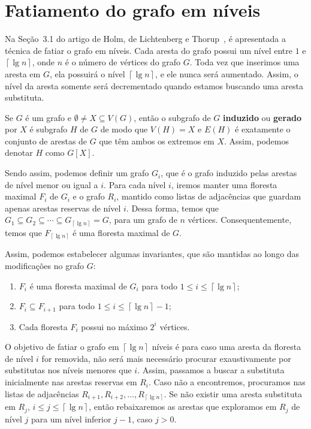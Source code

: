 \section{Fatiamento do grafo em níveis}
\label{sec:level-slicing}

Na Seção~3.1 do artigo de Holm, de Lichtenberg e Thorup~\cite{jacob_holm}, é apresentada a técnica de fatiar o grafo em níveis. Cada aresta do grafo possui um nível entre $1$ e $\left\lceil \lg n \right\rceil$, onde $n$ é o número de vértices do grafo $G$. Toda vez que inserimos uma aresta em $G$, ela possuirá o nível $\left\lceil \lg n \right\rceil$, e ele nunca será aumentado. Assim, o nível da aresta somente será decrementado quando estamos buscando uma aresta substituta. 

Se $G$ é um grafo e $\emptyset \neq X \subseteq V(G)$, então o subgrafo de $G$ \textbf{induzido} ou \textbf{gerado} por $X$ é subgrafo $H$ de $G$ de modo que $V(H) = X$ e $E(H)$ é exatamente o conjunto de arestas de $G$ que têm ambos os extremos em $X$. Assim, podemos denotar $H$ como $G[X]$.

Sendo assim, podemos definir um grafo $G_i$, que é o grafo induzido pelas arestas de nível menor ou igual a $i$. Para cada nível $i$, iremos manter uma floresta maximal $F_i$ de $G_i$ e o grafo $R_i$, mantido como listas de adjacências que guardam apenas arestas reservas de nível $i$. Dessa forma, temos que $G_1 \subseteq G_2 \subseteq \cdots \subseteq G_{\left\lceil \lg n \right\rceil} = G$, para um grafo de $n$ vértices. Consequentemente, temos que $F_{\left\lceil \lg n \right\rceil}$ é uma floresta maximal de $G$. 

Assim, podemos estabelecer algumas invariantes, que são mantidas ao longo das modificações no grafo $G$:

\begin{enumerate}[label=(\Roman*)]
    \item \label{invariant1} $F_i$ é uma floresta maximal de $G_i$ para todo $1 \leq i \leq  \left\lceil \lg n \right\rceil$;
    
    \item \label{invariant2} $F_i \subseteq F_{i+1}$ para todo $1 \leq i \leq \left\lceil \lg n \right\rceil - 1$;
    
    \item \label{invariant3} Cada floresta $F_i$ possui no máximo $2^i$ vértices.
\end{enumerate}

O objetivo de fatiar o grafo em  $\left\lceil \lg n \right\rceil$ níveis é para caso uma aresta da floresta de nível $i$ for removida, não será mais necessário procurar exaustivamente por substitutas nos níveis menores que $i$. Assim, passamos a buscar a substituta inicialmente nas arestas reservas em $R_i$. Caso não a encontremos, procuramos nas listas de adjacências $R_{i+1}, R_{i+2}, \ldots, R_{\left\lceil \lg n \right\rceil}$. Se não existir uma aresta substituta em $R_j$, $i \leq j \leq  \left\lceil \lg n \right\rceil$, então rebaixaremos as arestas que exploramos em $R_j$ de nível $j$ para um nível inferior $j-1$, caso $j > 0$. 


